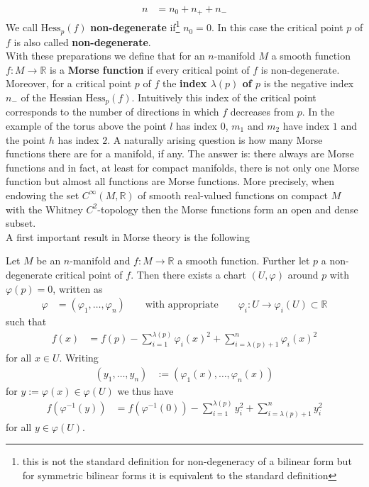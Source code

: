 \begin{align*}
  n
  &=
  n_{0}
  +
  n_{+}
  +
  n_{-}
\end{align*}
We call $\mathrm{Hess}_{p}(f)$ \textbf{non-degenerate} if\footnote{this is not the standard definition for non-degeneracy of a bilinear form but for symmetric bilinear forms it is equivalent to the standard definition} $n_{0} = 0$. In this case the critical point $p$ of $f$ is also called \textbf{non-degenerate}.
\\
With these preparations we define that for an $n$-manifold $M$ a smooth function $f \colon M \to \mathbb{R}$ is a \textbf{Morse function} if every critical point of $f$ is non-degenerate. Moreover, for a critical point $p$ of $f$ the \textbf{index $\lambda(p)$ of $p$} is the negative index $n_{-}$ of the Hessian $\mathrm{Hess}_{p}(f)$. Intuitively this index of the critical point corresponds to the number of directions in which $f$ decreases from $p$. In the example of the torus above the point $l$ has index $0$, $m_{1}$ and $m_{2}$ have index $1$ and the point $h$ has index $2$. A naturally arising question is how many Morse functions there are for a manifold, if any. The answer is: there always are Morse functions and in fact, at least for compact manifolds, there is not only one Morse function but {\glqq}almost all{\grqq} functions are Morse functions. More precisely, when endowing the set $C^{\infty}(M,\mathbb{R})$ of smooth real-valued functions on compact $M$ with the Whitney $C^{2}$-topology then the Morse functions form an open and dense subset.
\\
A first important result in Morse theory is the following
\\
\begin{lem}
\label{lem:morselem}
Let $M$ be an $n$-manifold and $f \colon M \to \mathbb{R}$ a smooth function. Further let $p$ a non-degenerate critical point of $f$. Then there exists a chart $(U,\varphi)$ around $p$ with $\varphi(p) = 0$, written as
\begin{align*}
  \varphi
  &=
  \left(
    \varphi_{1}
    ,
    \ldots
    ,
    \varphi_{n}
  \right)
  \qquad
  \text{with appropriate}
  \qquad
  \varphi_{i}
  \colon
  U
  \to
  \varphi_{i}(U)
  \subset
  \mathbb{R}
\end{align*}
such that
\begin{align*}
  f(x)
  &=
  f(p)
  -
  \sum_{i=1}^{\lambda(p)}
  \varphi_{i}(x)^{2}
  +
  \sum_{i=\lambda(p)+1}^{n}
  \varphi_{i}(x)^{2}
\end{align*}
for all $x \in U$. Writing
\begin{align*}
  \left(
    y_{1}
    ,
    \ldots
    ,
    y_{n}
  \right)
  &:=
  \left(
    \varphi_{1}(x)
    ,
    \ldots
    ,
    \varphi_{n}(x)
  \right)
\end{align*}
for $y := \varphi(x) \in \varphi(U)$ we thus have
\begin{align*}
  f(\varphi^{-1}(y))
  &=
  f(\varphi^{-1}(0))
  -
  \sum_{i=1}^{\lambda(p)}
  y_{i}^{2}
  +
  \sum_{i=\lambda(p)+1}^{n}
  y_{i}^{2}
\end{align*}
for all $y \in \varphi(U)$. 
\end{lem}
